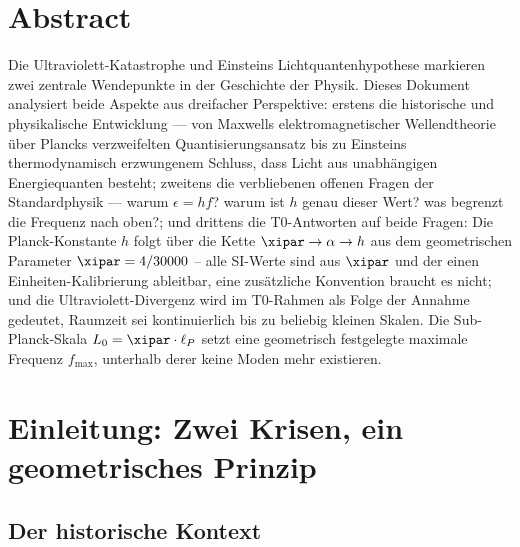 
\section*{Abstract}

Die Ultraviolett-Katastrophe und Einsteins Lichtquantenhypothese markieren zwei 
zentrale Wendepunkte in der Geschichte der Physik. Dieses Dokument 
analysiert beide Aspekte aus dreifacher Perspektive: erstens die historische und 
physikalische Entwicklung — von Maxwells elektromagnetischer Wellendtheorie über 
Plancks verzweifelten Quantisierungsansatz bis zu Einsteins thermodynamisch erzwungenem 
Schluss, dass Licht aus unabhängigen Energiequanten besteht; zweitens die verbliebenen 
offenen Fragen der Standardphysik — warum $\epsilon = hf$? warum ist $h$ genau dieser 
Wert? was begrenzt die Frequenz nach oben?; und drittens die T0-Antworten auf beide 
Fragen: Die Planck-Konstante $h$ folgt über die Kette $\xipar\to\alpha\to h$ aus dem geometrischen Parameter 
$\xipar = 4/30000$ -- alle SI-Werte sind aus $\xipar$ und der einen Einheiten-Kalibrierung ableitbar, eine zusätzliche Konvention braucht es nicht; und die Ultraviolett-Divergenz wird im T0-Rahmen als Folge der 
Annahme gedeutet, Raumzeit sei kontinuierlich bis zu beliebig 
kleinen Skalen. Die Sub-Planck-Skala $L_0 = \xipar \cdot \ell_P$ setzt eine geometrisch 
festgelegte maximale Frequenz $f_{\max}$, unterhalb derer keine Moden mehr existieren.

\clearpage

\section{Einleitung: Zwei Krisen, ein geometrisches Prinzip}
\label{sec:intro}

\subsection{Der historische Kontext}

